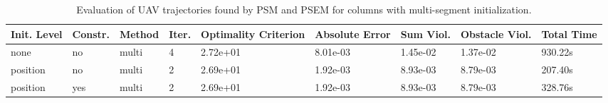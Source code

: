\begin{table}
\small

\caption{Evaluation of UAV trajectories found by PSM and PSEM for columns with multi-segment initialization.}
\label{tab:traj-plan-eval-columns-multi}
\begin{tabular}{p{21mm}p{9mm}p{12mm}p{6mm}p{14mm}p{14mm}p{14mm}p{14mm}p{14mm}}
\toprule
Init. Level & Constr. & Method & Iter. & Optimality Criterion & Absolute Error & Sum Viol. & Obstacle Viol. & Total Time \\
\midrule
none & no & multi & \cellcolor{color8} 4 & \cellcolor{color8} 2.72e+01 & \cellcolor{color8} 8.01e-03 & \cellcolor{color8} 1.45e-02 & \cellcolor{color8} 1.37e-02 & \cellcolor{color8} 930.22s \\
position & no & multi & \cellcolor{color3} 2 & \cellcolor{color3} 2.69e+01 & \cellcolor{color3} 1.92e-03 & \cellcolor{color3} 8.93e-03 & \cellcolor{color3} 8.79e-03 & \cellcolor{color3} 207.40s \\
position & yes & multi & \cellcolor{color3} 2 & \cellcolor{color3} 2.69e+01 & \cellcolor{color3} 1.92e-03 & \cellcolor{color3} 8.93e-03 & \cellcolor{color3} 8.79e-03 & 328.76s \\
\bottomrule
\end{tabular}
\end{table}
